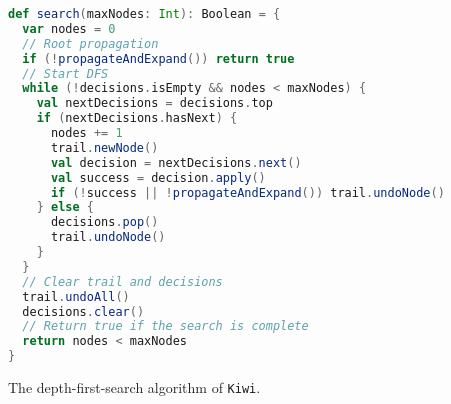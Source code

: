 \documentclass{llncs}
\begin{document}
\begin{code}
\begin{lstlisting}[language=scala, style=lineNumber] 
def search(maxNodes: Int): Boolean = {
  var nodes = 0
  // Root propagation
  if (!propagateAndExpand()) return true
  // Start DFS
  while (!decisions.isEmpty && nodes < maxNodes) {
    val nextDecisions = decisions.top
    if (nextDecisions.hasNext) {
      nodes += 1
      trail.newNode()
      val decision = nextDecisions.next()
      val success = decision.apply()
      if (!success || !propagateAndExpand()) trail.undoNode()
    } else {
      decisions.pop()
      trail.undoNode()
    }
  }
  // Clear trail and decisions
  trail.undoAll()
  decisions.clear()
  // Return true if the search is complete
  return nodes < maxNodes
}  
\end{lstlisting}
\caption{The depth-first-search algorithm of \texttt{Kiwi}.}
\label{code:dfs2}
\end{code}




\end{document}
